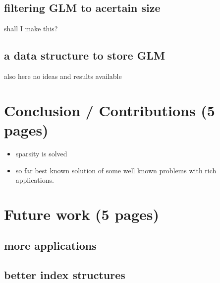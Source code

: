 \documentclass[•]{book}
\begin{document}
\section{filtering GLM to acertain size}
shall I make this?
\section{a data structure to store GLM}
also here no ideas and results available

\chapter{Conclusion / Contributions (5 pages)}
\begin{itemize}
\item sparsity is solved
\item so far best known solution of some well known problems with rich applications. 
\end{itemize}
\chapter{Future work (5 pages)}
\section{more applications}

\section{better index structures}



\end{document}
